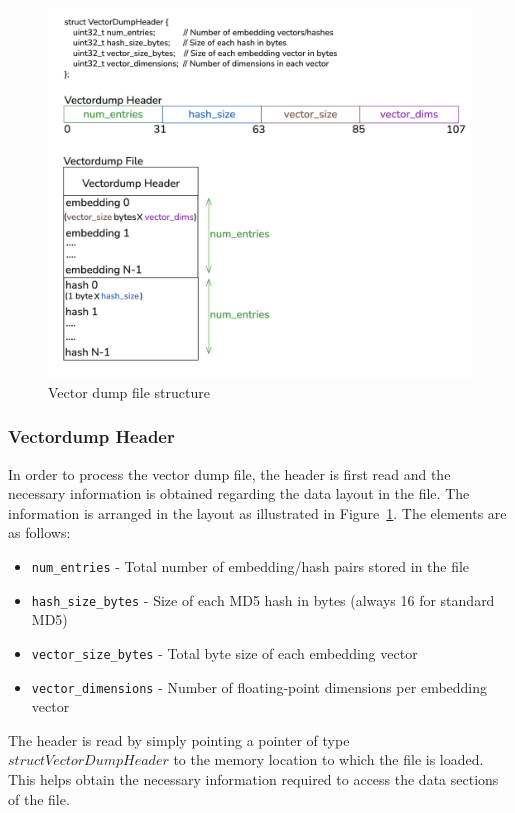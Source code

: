    \begin{figure}[h]
    \centering
    \includegraphics[width=0.9\linewidth]{images/VectorDumpFiles.png}
    \caption{Vector dump file structure}
    \label{fig:vectordumpfilestructure}
\end{figure}

\subsubsection{Vectordump Header}
\label{subsec:AppDesignModules-Vectordump_Header}
In order to process the vector dump file, the header is first read and the necessary information is obtained regarding the data layout in the file. The information is arranged in the layout as illustrated in Figure~\ref{fig:vectordumpfilestructure}. The elements are as follows:
\begin{itemize}
    \item \texttt{num\_entries} - Total number of embedding/hash pairs stored in the file
    \item \texttt{hash\_size\_bytes} - Size of each MD5 hash in bytes (always 16 for standard MD5)
    \item \texttt{vector\_size\_bytes} - Total byte size of each embedding vector
    \item \texttt{vector\_dimensions} - Number of floating-point dimensions per embedding vector
\end{itemize}

The header is read by simply pointing a pointer of type $struct VectorDumpHeader$ to the memory location to which the file is loaded. This helps obtain the necessary information required to access the data sections of the file.

